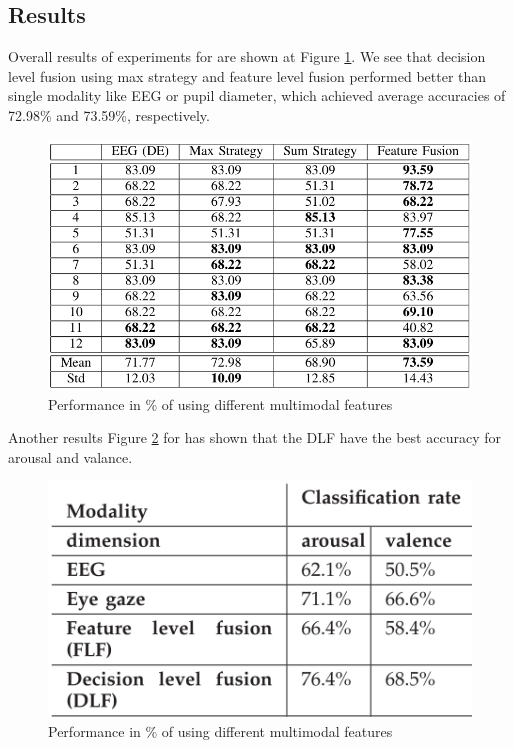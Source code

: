 \documentclass[10pt,journal,compsoc,twoside]{IEEEtran}
\newcommand{\Ref}[2]{#2 \ref{#1}}
\begin{document}
\subsection{Results}
Overall results of experiments for \cite{WeiLongBoNanBaoLiang2014} are shown at \Ref{fig:result1}{Figure}.
We see that decision level fusion using max strategy and feature level fusion performed better than single modality like EEG or pupil diameter, which achieved average accuracies of 72.98\% and 73.59\%, respectively.
\begin{figure}[ht]
	\centering
	\includegraphics[width=1.0\linewidth]{result1}
	\caption{ Performance in \% of using different multimodal features \cite{WeiLongBoNanBaoLiang2014}}
	\label{fig:result1}
\end{figure}

Another results \Ref{fig:result2}{Figure} for \cite{SoleymaniPanticPun2002} has shown that the DLF have the best accuracy for arousal and valance. 

\begin{figure}[ht]
	\centering
	\includegraphics[width=0.7\linewidth]{result2}
	\caption{ Performance in \% of using different multimodal features \cite{SoleymaniPanticPun2002}}
	\label{fig:result2}
\end{figure}
\end{document}
